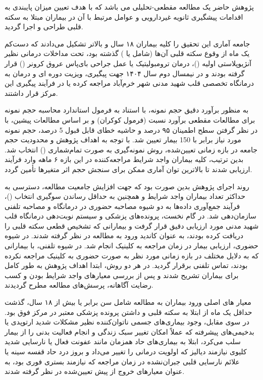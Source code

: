 پژوهش حاضر یک مطالعه مقطعی-تحلیلی می باشد که با هدف تعیین میزان پایبندی به اقدامات پیشگیری ثانویه غیردارویی و عوامل مرتبط با آن در بیماران مبتلا به سکته قلبی طراحی و اجرا گردید.

جامعه آماری این تحقیق را کلیه بیماران ۱۸ سال و بالاتر تشکیل می‌دادند که دست‌کم یک ماه از وقوع سکته قلبی آن‌ها (شامل  یا ) گذشته بود، تحت مداخلات درمانی نظیر آنژیوپلاستی اولیه ()، درمان ترومبولیتیک یا عمل جراحی بای‌پاس عروق کرونر () قرار گرفته بودند و در نیمسال دوم سال ۱۴۰۴ جهت پیگیری، ویزیت دوره ای و درمان به درمانگاه تخصصی قلب شهید مدنی شهر خرم‌آباد مراجعه کرده یا در فرآیند پیگیری این مرکز قرار داشتند.

به منظور برآورد دقيق حجم نمونه، با استناد به فرمول استاندارد محاسبه حجم نمونه برای مطالعات مقطعی برآورد نسبت (فرمول کوکران) و بر اساس مطالعات پیشین\cite{Sibhatu2025CADPrevention,Najafi2016TelephoneFollowUp}، با در نظر گرفتن سطح اطمینان ۹۵ درصد و حاشیه خطای قابل قبول 5 درصد، حجم نمونه مورد نیاز برابر با 150 بیمار تعیین شد. با توجه به اهداف پژوهش و محدودیت حجم جامعه در بازه زمانی تعیین‌شده، روش نمونه‌گیری به صورت تمام‌شماری () انتخاب شد. بدین ترتیب، کلیه بیماران واجد شرایط مراجعه‌کننده در این بازه ۶ ماهه وارد فرآیند ارزیابی شدند تا بالاترین توان آماری ممکن برای سنجش حجم اثر متغیرها تأمین گردد.

روند اجرای پژوهش بدین صورت بود که جهت افزایش جامعیت مطالعه، دسترسی به حداکثر تعداد بیماران واجد شرایط و همچنین به حداقل رساندن سوگیری انتخاب ()، فرآیند جمع‌آوری داده‌ها به دو شیوه مصاحبه حضوری در درمانگاه و مصاحبه تلفنی سازمان‌دهی شد. در گام نخست، پرونده‌های پزشکی و سیستم نوبت‌دهی درمانگاه قلب شهید مدنی مورد ارزیابی دقيق قرار گرفت و بیمارانی که تشخیص قطعی سکته قلبی را دریافت کرده بودند، به عنوان کاندید ورود به مطالعه در نظر گرفته شدند. در شیوه حضوری، ارزیابی بیمار در زمان مراجعه به کلینیک انجام شد. در شیوه تلفنی، با بیمارانی که به دلایل مختلف در بازه زمانی مورد نظر به صورت حضوری به کلینیک مراجعه نکرده بودند، تماس تلفنی برقرار گردید. در هر دو روش، ابتدا اهداف پژوهش به طور کامل برای بیماران تشریح شدند و پس از بررسی معیارهای واجد شرایط بودن و کسب رضایت آگاهانه، پرسش‌های مطالعه مطرح گردیدند.

معیار های اصلی ورود بیماران به مطالعه شامل سن برابر یا بیش از ۱۸ سال، گذشت حداقل یک ماه از ابتلا به سکته قلبی و داشتن پرونده پزشکی معتبر در مرکز فوق بود. در سوی مقابل، وجود بیماری‌های جسمی ناتوان‌کننده نظیر مشکلات شدید ارتوپدی یا بدخیمی‌های پیشرفته که عملاً امکان تغییر سبک زندگی و انجام فعالیت بدنی را از بیمار سلب می‌کرد، ابتلا به بیماری‌های حاد همزمان مانند عفونت فعال یا نارسایی شدید کلیوی نیازمند دیالیز که اولویت درمانی را تغییر می‌داد و بروز درد حاد قفسه سینه یا علائم نارسایی قلبی جبران‌نشده در زمان مراجعه که نیازمند بستری فوری بود، به عنوان معیارهای خروج از پیش تعیین‌شده در نظر گرفته شدند.


